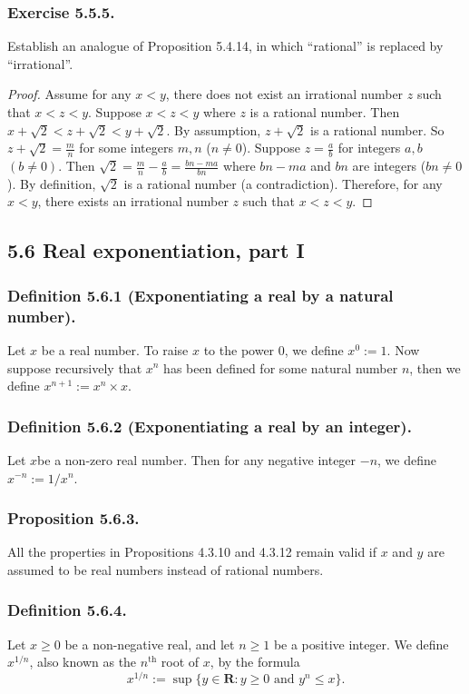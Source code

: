 \documentclass[12pt, letter]{article}
\begin{document}
\subsubsection*{Exercise 5.5.5.}
Establish an analogue of Proposition 5.4.14, in which ``rational'' is replaced by ``irrational''.
\begin{proof}
    Assume for any $x<y$, there does not exist an irrational number $z$ such that $x<z<y$. Suppose $x<z<y$ where $z$ is a rational number. Then $x+\sqrt{2}<z+\sqrt{2}<y+\sqrt{2}$. By assumption,
    $z+\sqrt{2}$ is a rational number. So $z+\sqrt{2}=\frac{m}{n}$ for some integers $m,n$ ($n\ne 0$). Suppose $z=\frac{a}{b}$ for integers $a,b$ $(b\ne 0)$.
    Then $\sqrt{2}=\frac{m}{n}-\frac{a}{b}=\frac{bn-ma}{bn}$ where $bn-ma$ and $bn$ are integers ($bn\ne 0$). By definition, $\sqrt{2}$ is a rational number (a contradiction).
    Therefore, for any $x<y$, there exists an irrational number $z$ such that $x<z<y$.
\end{proof}
\subsection*{5.6 Real exponentiation, part I}
\subsubsection*{Definition 5.6.1 (Exponentiating a real by a natural number).}
Let $x$ be a real number. To raise $x$ to the power 0, we define $x^0:=1$. Now suppose recursively that $x^n$ has been defined for some natural number $n$, then we define $x^{n+1}:=x^n\times x$.
\subsubsection*{Definition 5.6.2 (Exponentiating a real by an integer).}
Let $x $be a non-zero real number. Then for any negative integer $-n$, we define $x^{-n}:=1/x^n$.
\subsubsection*{Proposition 5.6.3.}
All the properties in Propositions 4.3.10 and 4.3.12 remain valid if $x$ and $y$ are assumed to be real numbers instead of rational numbers.
\subsubsection*{Definition 5.6.4.}
Let $x\geq 0$ be a non-negative real, and let $n\geq 1$ be a positive integer. We define $x^{1/n}$, also known as the $n^\text{th}$ root of $x$, by the formula
\begin{equation*}
    x^{1/n}:=\sup\{y\in\mathbf{R}:y\geq 0\text{ and }y^n\leq x\}.
\end{equation*}
\end{document}
